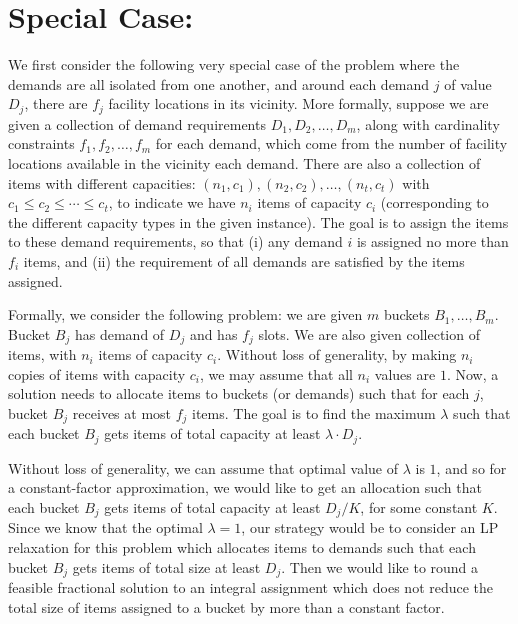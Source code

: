 \section{Special Case: \cckp}
We first consider the following very special case of the \mckc problem where the demands are all isolated from one another, and around each demand $j$ of value $D_j$, there are $f_j$ facility locations in its vicinity. More formally, suppose we are given a collection of demand requirements $D_1, D_2, \ldots, D_m$, along with cardinality constraints $f_1, f_2, \ldots, f_m$ for each demand, which come from the number of facility locations available in the vicinity each demand. There are also a collection of items with different capacities: $(n_1,c_1), (n_2,c_2),\ldots, (n_t,c_t)$
with $c_1 \leq c_2 \le \cdots \le c_t$,
to indicate we have $n_i$ items of capacity $c_i$ (corresponding to the different capacity types in the given \mckc instance). The goal is to assign the items to these demand requirements, so that (i) any demand $i$ is assigned no more than $f_i$ items, and (ii) the requirement of all demands are satisfied by the items assigned.

Formally, we consider the following problem: we are given $m$ buckets $B_1, \ldots, B_m$. Bucket $B_j$ has demand of $D_j$ and has $f_j$ slots. We are also given collection of items, with $n_i$ items of capacity $c_i$. Without loss of generality, by making $n_i$ copies of items with capacity $c_i$, we may assume that all $n_i$ values are $1$. Now, a solution needs to allocate items to buckets (or demands) such that for each $j$,  bucket $B_j$ receives at most $f_j$ items. The goal is to find the maximum $\lambda$ such that each bucket $B_j$ gets items of total capacity at least $\lambda \cdot D_j$.

Without loss of generality, we can assume that optimal value of $\lambda$ is $1$, and so for a constant-factor approximation, we would like to get an allocation such that each bucket $B_j$ gets items of total capacity at least $D_j/K$, for some constant $K$. Since we know that the optimal $\lambda=1$, our strategy would be to consider an LP relaxation for this problem which allocates items to demands such that each bucket $B_j$ gets items of total size at least $D_j$. Then we would like to round a feasible fractional solution to an integral assignment which does not reduce the total size of items assigned to a bucket by more than a constant factor.

